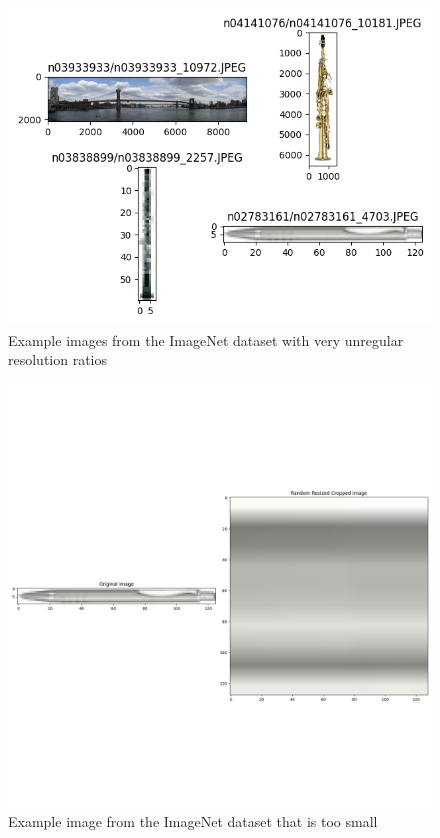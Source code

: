 \documentclass[10pt,a4paper,twoside]{article}
\begin{document}
\begin{figure}
    \centering
    \includegraphics[width=\textwidth]{../../sample_images/optima_shape_examples.png}
    \caption{Example images from the ImageNet dataset with very unregular resolution ratios}
    \label{fig:optimal_resolution}
\end{figure}

\begin{figure}
    \centering
    \includegraphics[width=\textwidth]{../../sample_images/random_resized_crop_small.png}
    \caption{Example image from the ImageNet dataset that is too small}
    \label{fig:small_image}
\end{figure}
\end{document}
